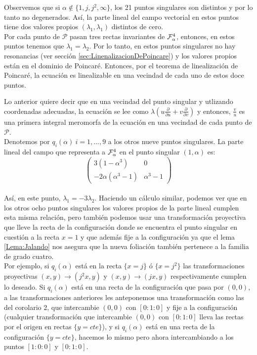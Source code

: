 Observemos que si $\alpha\notin\{1,j,j^{2},\infty \}$, los 21 puntos singulares son distintos y por lo tanto no degenerados. Así, la parte lineal del campo vectorial en estos puntos tiene dos valores propios $(\lambda_{1},\lambda_{1})$ distintos de cero.\\

Por cada punto de $\mathcal{P}$ pasan tres rectas invariantes de $\Fol[4]{\alpha}$, entonces, en estos puntos tenemos que $\lambda_{1} = \lambda_{2}$. Por lo tanto, en estos puntos singulares no hay resonancias (ver sección \ref{sec:LinenalizacionDePoincare}) y los valores propios están en el dominio de Poincaré. Entonces, por el teorema de linealización de Poincaré, la ecuación es linealizable en una vecindad de cada uno de estos doce puntos.

Lo anterior quiere decir que en una vecindad del punto singular y utlizando coordenadas adecuadas, la ecuación se lee como $ \lambda (u \frac{\partial}{\partial u} + v \frac{\partial}{\partial v})$ y entonces, $\frac{v}{u}$ es una primera integral meromorfa de la ecuación en una vecindad de cada punto de $\mathcal{P}$.
\\

Denotemos por $q_{i}(\alpha) \ i=1,...,9$ a los otros nueve puntos singulares. La parte lineal del campo que representa a $\Fol[4]{\alpha}$  en el punto singular $(1,\alpha )$ es:
\\

$$\begin{pmatrix}

3(1-\alpha^{3}) & 0 \\
-2\alpha(\alpha^{3}-1) & \alpha^{3} -1

\end{pmatrix}$$
\\

\noindent Así, en este punto, $\lambda_{1} = -3\lambda_{2}$. Haciendo un cálculo similar, podemos ver que en los otros ocho puntos singulares los valores propios de la parte lineal cumplen esta misma relación, pero también podemos usar una transformación proyectiva que lleve la recta de la configuración donde se encuentra el punto singular en cuestión a la recta $x=1$ y que además fije a la configuración  ya que el lema \ref{Lema:Jalando} nos asegura que la nueva foliación también pertenece a la familia de grado cuatro.
\\

Por ejemplo, si $q_{i}(\alpha)$ está en la recta $\{ x = j \}$ ó $\{ x = j^{2} \}$ las transformaciones proyectivas $(x,y) \rightarrow (j^{2}x,y)$ y $(x,y) \rightarrow (jx,y)$ respectivamente cumplen lo deseado. Si $q_{i}(\alpha)$ está en una recta de la configuración que pasa por $(0,0)$, a las transformaciones anteriores les anteponemos una transformación como las del corolario 2, que intercambie $(0,0)$ con $[0:1:0]$ y fije a la configuración (cualquier transformación que intercambie $(0,0)$ con $[0:1:0]$ lleva las rectas por el origen en rectas $\{y=cte\}$), y si $q_{i}(\alpha)$ está en una recta de la configuración $\{ y = cte \}$, hacemos lo mismo pero ahora intercambiando a los puntos $[1:0:0]$ y $[0:1:0]$.
\\

